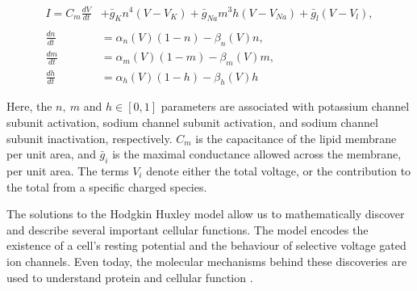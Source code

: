 \begin{equation}
	\label{hh_equations}
\begin{aligned}
	I = C_m \frac{dV}{dt} &+ \bar{g}_K n^4 (V - V_K) + \bar{g}_{Na} m^3 h (V - V_{Na} ) + \bar{g}_l (V-V_l) , \\ \\
	\frac{dn}{dt} &= \alpha_n(V)  (1-n) - \beta_n(V)  n, \\
	\frac{dm}{dt} &= \alpha_m(V)  (1-m) - \beta_m(V)  m, \\ 
	\frac{dh}{dt} &= \alpha_h(V)  (1-h) - \beta_h(V)  h  
\end{aligned}
\end{equation}

Here, the $n,\ m$ and $h \in [0,1]$ parameters are associated with potassium channel subunit activation, sodium channel subunit activation, and sodium channel subunit inactivation, respectively. $C_m$ is the capacitance of the lipid membrane per unit area, and $\bar{g}_i$ is the maximal conductance allowed across the membrane, per unit area. The terms $V_i$ denote either the total voltage, or the contribution to the total from a specific charged species.

The solutions to the Hodgkin Huxley model allow us to mathematically discover and describe several important cellular functions. The model encodes the existence of a cell's resting potential and the behaviour of selective voltage gated ion channels. Even today, the molecular mechanisms behind these discoveries are used to understand protein and cellular function \cite{aidley1996}. 

